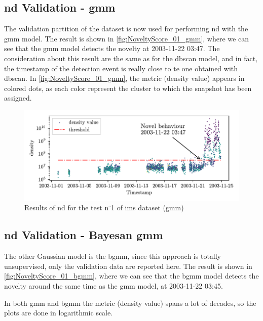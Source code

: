 \subsection{\gls{nd} Validation - \gls{gmm}}
The validation partition of the dataset is now used for performing \gls{nd} with the \gls{gmm} model. The result is shown in \autoref{fig:NoveltyScore_01_gmm}, where we can see that the \gls{gmm} model detects the novelty at 2003-11-22 03:47. The consideration about this result are the same as for the \gls{dbscan} model, and in fact, the timestamp of the detection event is really close to te one obtained with \gls{dbscan}. In \autoref{fig:NoveltyScore_01_gmm}, the metric (density value) appears in colored dots, as each color represent the cluster to which the snapshot has been assigned.
\begin{figure}
    \centering
    \includegraphics{images/IMS/Novelty_01_500samples_bearing3x_gmm.pdf}
    \caption{Results of \gls{nd} for the test $\text{n}^\circ$1 of \gls{ims} dataset (\gls{gmm})}
    \label{fig:NoveltyScore_01_gmm}
\end{figure}

\subsection{\gls{nd} Validation - Bayesan \gls{gmm}}
The other Gaussian model is the \gls{bgmm}, since this approach is totally unsupervised, only the validation data are reported here. The result is shown in \autoref{fig:NoveltyScore_01_bgmm}, where we can see that the \gls{bgmm} model detects the novelty around the same time as the \gls{gmm} model, at 2003-11-22 03:45.

In both \gls{gmm} and \gls{bgmm} the metric (density value) spans a lot of decades, so the plots are done in logarithmic scale.

